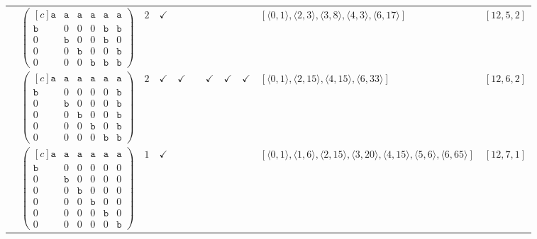 \documentclass[12pt]{article}
\theoremstyle{definition}
\theoremstyle{plain}
\begin{document}
{\begin{longtable}{@{}cYcccccccZc@{}}
\cmidrule(lr){2-11}

& $\begin{pmatrix*}[c]
\mathtt{a}  &  \mathtt{a}  &  \mathtt{a}  &  \mathtt{a}  &  \mathtt{a}  &  \mathtt{a}  \\
\mathtt{b}  &  0  &  0  &  0  &  \mathtt{b}  &  \mathtt{b}  \\
0  &  \mathtt{b}  &  0  &  0  &  \mathtt{b}  &  0  \\
0  &  0  &  \mathtt{b}  &  0  &  0  &  \mathtt{b}  \\
0  &  0  &  0  &  \mathtt{b}  &  \mathtt{b}  &  \mathtt{b}
\end{pmatrix*}$
& $2$
& $\checkmark$
&
&
&
&
&
& $[\langle0,1\rangle,\allowbreak\langle2,3\rangle,\allowbreak\langle3,8\rangle,\allowbreak\langle4,3\rangle,\allowbreak\langle6,17\rangle]$
& $[12,5,2]$    \\

\cmidrule(lr){2-11}

& $\begin{pmatrix*}[c]
\mathtt{a}  &  \mathtt{a}  &  \mathtt{a}  &  \mathtt{a}  &  \mathtt{a}  &  \mathtt{a}  \\
\mathtt{b}  &  0  &  0  &  0  &  0  &  \mathtt{b}  \\
0  &  \mathtt{b}  &  0  &  0  &  0  &  \mathtt{b}  \\
0  &  0  &  \mathtt{b}  &  0  &  0  & \mathtt{b}   \\
0  &  0  &  0  &  \mathtt{b}  &  0   &  \mathtt{b}  \\
0  &  0  &  0  &  0  &  \mathtt{b}   &  \mathtt{b}
\end{pmatrix*}$
& $2$
& $\checkmark$
& $\checkmark$
&
& $\checkmark$
& $\checkmark$
& $\checkmark$
& $[\langle0,1\rangle,\allowbreak\langle2,15\rangle,\allowbreak\langle4,15\rangle,\allowbreak\langle6,33\rangle]$
& $[12,6,2]$     \\

\cmidrule(lr){2-11}

& $\begin{pmatrix*}[c]
\mathtt{a}  &  \mathtt{a}  &  \mathtt{a}  &  \mathtt{a}  &  \mathtt{a}  &  \mathtt{a}  \\
\mathtt{b}  &  0  &  0  &  0  &  0  &  0  \\
0  &  \mathtt{b}  &  0  &  0  &  0  & 0  \\
0  &  0  &  \mathtt{b}  &  0  &  0  & 0   \\
0  &  0  &  0  &  \mathtt{b}  &  0   &  0  \\
0  &  0  &  0  &  0  &  \mathtt{b}   &  0  \\
0  &  0  &  0  &  0  &  0   &  \mathtt{b}
\end{pmatrix*}$
& $1$
& $\checkmark$
&
&
&
&
&
& $[\langle0,1\rangle,\allowbreak\langle1,6\rangle,\allowbreak\langle2,15\rangle,\allowbreak\langle3,20\rangle,\allowbreak\langle4,15\rangle,\allowbreak\langle5,6\rangle,\allowbreak\langle6,65\rangle]$
& $[12,7,1]$\\


\end{longtable}}
\end{document}
